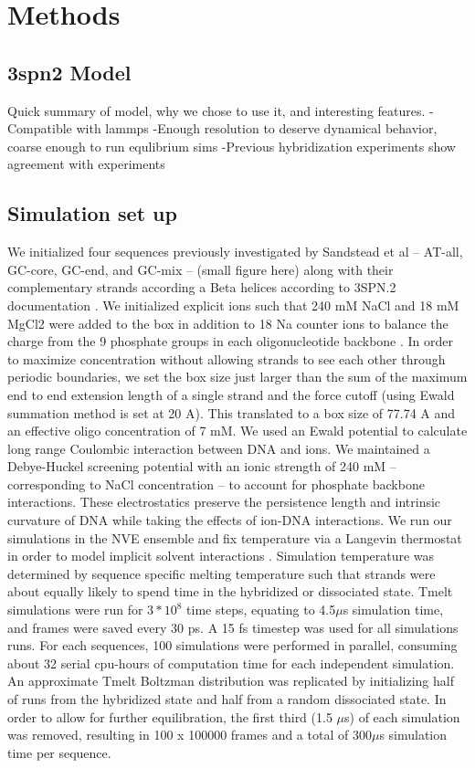 \documentclass[journal=jpcbfk,manuscript=article]{achemso}
\begin{document}
\section{\label{sec:methods}Methods}

\subsection{\label{sec:methods}3spn2 Model}
Quick summary of model, why we chose to use it, and interesting features.
-Compatible with lammps
-Enough resolution to deserve dynamical behavior, coarse enough to run equlibrium sims
-Previous hybridization experiments show agreement with experiments

\subsection{\label{sec:methods}Simulation set up}

We initialized four sequences previously investigated by Sandstead et al \citep{Sanstead2016} -- AT-all, GC-core, GC-end, and GC-mix -- (small figure here) along with their complementary strands according a Beta helices according to 3SPN.2 documentation \citep{Phys2014}. We initialized explicit ions such that 240 mM NaCl and 18 mM MgCl2 were added to the box in addition to 18 Na counter ions to balance the charge from the 9 phosphate groups in each oligonucleotide backbone \citep{Hinckley2015}. In order to maximize concentration without allowing strands to see each other through periodic boundaries, we set the box size just larger than the sum of the maximum end to end extension length of a single strand and the force cutoff (using Ewald summation method is set at 20 A). This translated to a box size of 77.74 A and an effective oligo concentration of 7 mM. We used an Ewald potential to calculate long range Coulombic interaction between DNA and ions. We maintained a Debye-Huckel screening potential with an ionic strength of 240 mM -- corresponding to NaCl concentration -- to account for phosphate backbone interactions. These electrostatics preserve the persistence length and intrinsic curvature of DNA while taking the effects of ion-DNA interactions\citep{Hinckley2015}. We run our simulations in the NVE ensemble and fix temperature via a Langevin thermostat in order to model implicit solvent interactions \citep{Schneider1978Molecular-dynamicsTransitions}. Simulation temperature was determined by sequence specific melting temperature such that strands were about equally likely to spend time in the hybridized or dissociated state. Tmelt simulations were run for $3*10^{8}$ time steps, equating to 4.5$\mu$s simulation time, and frames were saved every 30 ps. A 15 fs timestep was used for all simulations runs. For each sequences, 100 simulations were performed in parallel, consuming about 32 serial cpu-hours of computation time for each independent simulation. An approximate Tmelt Boltzman distribution was replicated by initializing half of runs from the hybridized state and half from a random dissociated state. In order to allow for further equilibration, the first third (1.5 $\mu$s) of each simulation was removed, resulting in 100 x 100000 frames and a total of 300$\mu$s simulation time per sequence.
\end{document}
